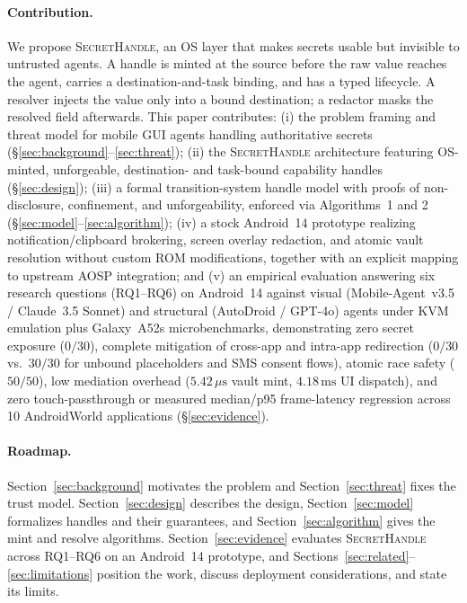 \documentclass[sigconf,10pt]{acmart}
\newcommand{\SH}{\textsc{SecretHandle}}
\theoremstyle{acmplain}%
\begin{document}
\paragraph{Contribution.} We propose \SH, an OS layer that makes secrets usable but invisible to untrusted agents. A handle is minted at the source before the raw value reaches the agent, carries a destination-and-task binding, and has a typed lifecycle. A resolver injects the value only into a bound destination; a redactor masks the resolved field afterwards. This paper contributes: (i) the problem framing and threat model for mobile GUI agents handling authoritative secrets (\S\ref{sec:background}--\ref{sec:threat}); (ii) the \SH{} architecture featuring OS-minted, unforgeable, destination- and task-bound capability handles (\S\ref{sec:design}); (iii) a formal transition-system handle model with proofs of non-disclosure, confinement, and unforgeability, enforced via Algorithms~1 and 2 (\S\ref{sec:model}--\ref{sec:algorithm}); (iv) a stock Android~14 prototype realizing notification/clipboard brokering, screen overlay redaction, and atomic vault resolution without custom ROM modifications, together with an explicit mapping to upstream AOSP integration; and (v) an empirical evaluation answering six research questions (RQ1--RQ6) on Android~14 against visual (Mobile-Agent~v3.5 / Claude~3.5 Sonnet) and structural (AutoDroid / GPT-4o) agents under KVM emulation plus Galaxy~A52s microbenchmarks, demonstrating zero secret exposure ($0/30$), complete mitigation of cross-app and intra-app redirection ($0/30$ vs.\ $30/30$ for unbound placeholders and SMS consent flows), atomic race safety ($50/50$), low mediation overhead ($5.42\,\mu\text{s}$ vault mint, $4.18\,\text{ms}$ UI dispatch), and zero touch-passthrough or measured median/p95 frame-latency regression across 10 AndroidWorld applications (\S\ref{sec:evidence}).

\paragraph{Roadmap.} Section~\ref{sec:background} motivates the problem and Section~\ref{sec:threat} fixes the trust model. Section~\ref{sec:design} describes the design, Section~\ref{sec:model} formalizes handles and their guarantees, and Section~\ref{sec:algorithm} gives the mint and resolve algorithms. Section~\ref{sec:evidence} evaluates \SH{} across RQ1--RQ6 on an Android~14 prototype, and Sections~\ref{sec:related}--\ref{sec:limitations} position the work, discuss deployment considerations, and state its limits.
\end{document}
